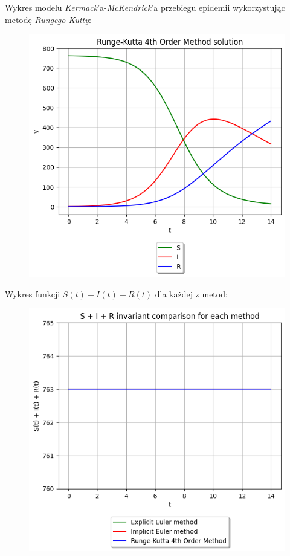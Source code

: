 \documentclass{article}
\begin{document}
Wykres modelu \textit{Kermack}’a-\textit{McKendrick}'a przebiegu epidemii
wykorzystując metodę \textit{Rungego Kutty}:
\begin{figure}[H]
  \includegraphics[width=\linewidth]{figures/SIR_rk4.png}
\end{figure}

Wykres funkcji $S(t)+I(t)+R(t)$ dla każdej z metod:
\begin{figure}[H]
  \includegraphics[width=\linewidth]{figures/invariant.png}
\end{figure}
\end{document}

